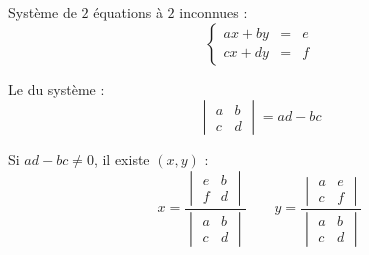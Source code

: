 \begin{frame}

\hfill{}

Système de $2$ équations à $2$ inconnues :
$$
\left\{\begin{array}{rcl} 
a x + b y & = & e\\
c x + d y & = & f 
\end{array}\right.  
$$

\pause

Le  du système :
$$ \begin{vmatrix} a & b \\ c & d \end{vmatrix}=ad-bc$$

\pause

Si $ad-bc\neq 0$, il existe  $(x,y)$ :
$$x = \frac{\begin{vmatrix} e & b \\ f & d \end{vmatrix}}{\begin{vmatrix} a & b \\ c & d \end{vmatrix}} \qquad 
y = \frac{\begin{vmatrix} a & e \\ c & f \end{vmatrix}}{\begin{vmatrix} a & b \\ c & d \end{vmatrix}}$$

\end{frame}



